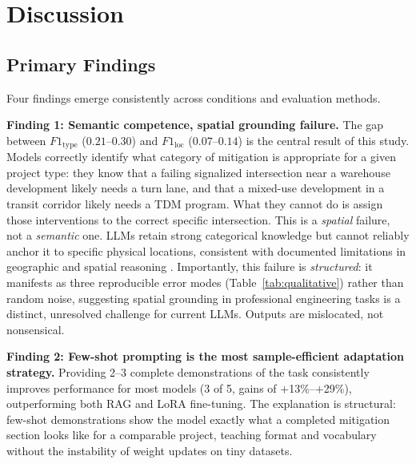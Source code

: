 \documentclass[preprint,12pt]{elsarticle}
\begin{document}
\section{Discussion}
\label{sec:discussion}

\subsection{Primary Findings}

Four findings emerge consistently across conditions and evaluation methods.

\textbf{Finding 1: Semantic competence, spatial grounding failure.}
The gap between $F1_\text{type}$ ($0.21$--$0.30$) and $F1_\text{loc}$
($0.07$--$0.14$) is the central result of this study.
Models correctly identify what category of mitigation is appropriate for a
given project type: they know that a failing signalized intersection near
a warehouse development likely needs a turn lane, and that a mixed-use
development in a transit corridor likely needs a TDM program.
What they cannot do is assign those interventions to the correct specific
intersection.
This is a \emph{spatial} failure, not a \emph{semantic} one.
LLMs retain strong categorical knowledge but cannot reliably anchor it to
specific physical locations, consistent with documented limitations in
geographic and spatial reasoning \citep{bubeck2023sparks, openai2023gpt4}.
Importantly, this failure is \emph{structured}: it manifests as three
reproducible error modes (Table~\ref{tab:qualitative}) rather than random
noise, suggesting spatial grounding in professional engineering tasks is a
distinct, unresolved challenge for current LLMs.
Outputs are mislocated, not nonsensical.

\textbf{Finding 2: Few-shot prompting is the most sample-efficient adaptation strategy.}
Providing 2--3 complete demonstrations of the task consistently improves
performance for most models (3 of 5, gains of $+$13\%--$+$29\%),
outperforming both RAG and LoRA fine-tuning.
The explanation is structural: few-shot demonstrations show the model
exactly what a completed mitigation section looks like for a comparable
project, teaching format and vocabulary without the instability of
weight updates on tiny datasets.
\end{document}
